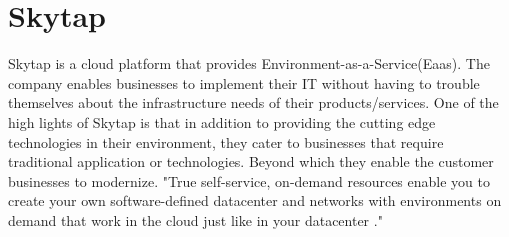 \section{Skytap}
Skytap is a cloud platform that provides Environment-as-a-Service(Eaas). The
company enables businesses to implement their IT without having to
trouble themselves about the infrastructure needs of their products/services.
One of the high lights of Skytap is that in addition to providing the
cutting edge technologies in their environment, they cater to businesses that
require traditional application or technologies. Beyond which they enable the
customer businesses to modernize. "True self-service, on-demand resources
enable you to create your own software-defined datacenter and networks with
environments on demand that work in the cloud just like in your datacenter
."\cite{hid-sp18-411-skytap}